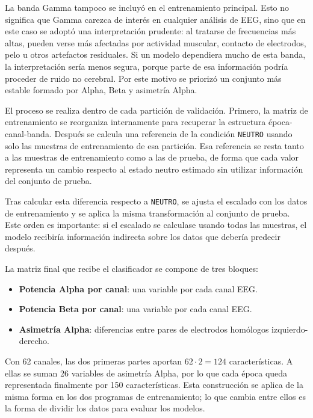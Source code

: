 La banda Gamma tampoco se incluyó en el entrenamiento principal. Esto no significa que Gamma carezca de interés en cualquier análisis de \ac{EEG}, sino que en este caso se adoptó una interpretación prudente: al tratarse de frecuencias más altas, pueden verse más afectadas por actividad muscular, contacto de electrodos, pelo u otros artefactos residuales. Si un modelo dependiera mucho de esta banda, la interpretación sería menos segura, porque parte de esa información podría proceder de ruido no cerebral. Por este motivo se priorizó un conjunto más estable formado por Alpha, Beta y asimetría Alpha.

El proceso se realiza dentro de cada partición de validación. Primero, la matriz de entrenamiento se reorganiza internamente para recuperar la estructura época-canal-banda. Después se calcula una referencia de la condición \texttt{NEUTRO} usando solo las muestras de entrenamiento de esa partición. Esa referencia se resta tanto a las muestras de entrenamiento como a las de prueba, de forma que cada valor representa un cambio respecto al estado neutro estimado sin utilizar información del conjunto de prueba.

Tras calcular esta diferencia respecto a \texttt{NEUTRO}, se ajusta el escalado con los datos de entrenamiento y se aplica la misma transformación al conjunto de prueba. Este orden es importante: si el escalado se calculase usando todas las muestras, el modelo recibiría información indirecta sobre los datos que debería predecir después.

La matriz final que recibe el clasificador se compone de tres bloques:

\begin{itemize}
    \item \textbf{Potencia Alpha por canal}: una variable por cada canal \ac{EEG}.
    \item \textbf{Potencia Beta por canal}: una variable por cada canal \ac{EEG}.
    \item \textbf{Asimetría Alpha}: diferencias entre pares de electrodos homólogos izquierdo-derecho.
\end{itemize}

Con 62 canales, las dos primeras partes aportan \(62 \cdot 2 = 124\) características. A ellas se suman 26 variables de asimetría Alpha, por lo que cada época queda representada finalmente por 150 características. Esta construcción se aplica de la misma forma en los dos programas de entrenamiento; lo que cambia entre ellos es la forma de dividir los datos para evaluar los modelos.

